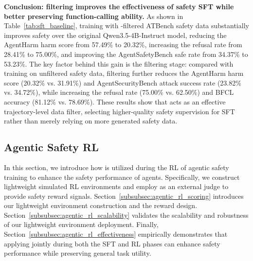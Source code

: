 \textbf{Conclusion: \toolAG{} filtering improves the effectiveness of safety SFT while better preserving function-calling ability.}
As shown in Table~\ref{tab:sft_baseline}, training with \toolAG{}-filtered ATBench safety data substantially improves safety over the original Qwen3.5-4B-Instruct model, reducing the AgentHarm harm score from 57.49\% to 20.32\%, increasing the refusal rate from 28.41\% to 75.00\%, and improving the AgentSafetyBench safe rate from 34.37\% to 53.23\%. The key factor behind this gain is the filtering stage: compared with training on unfiltered safety data, \toolAG{} filtering further reduces the AgentHarm harm score (20.32\% vs. 31.91\%) and AgentSecurityBench attack success rate (23.82\% vs. 34.72\%), while increasing the refusal rate (75.00\% vs. 62.50\%) and BFCL accuracy (81.12\% vs. 78.69\%). These results show that \toolAG{} acts as an effective trajectory-level data filter, selecting higher-quality safety supervision for SFT rather than merely relying on more generated safety data.


\subsection{Agentic Safety RL}
\label{subsec:agentic_rl}
In this section, we introduce how \toolAG{} is utilized during the RL of agentic safety training to enhance the safety performance of agents. Specifically, we construct lightweight simulated RL environments and employ \toolAG{} as an external judge to provide safety reward signals. Section~\ref{subsubsec:agentic_rl_scoring} introduces our lightweight environment construction and the reward design. Section~\ref{subsubsec:agentic_rl_scalability} validates the scalability and robustness of our lightweight environment deployment. Finally, Section~\ref{subsubsec:agentic_rl_effectiveness} empirically demonstrates that applying \toolAG{} jointly during both the SFT and RL phases can enhance safety performance while preserving general task utility.


